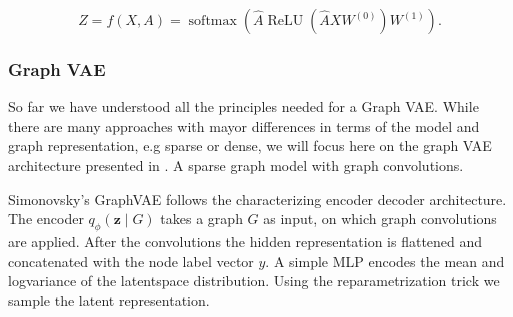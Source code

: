 \begin{equation}
    Z=f(X, A)=\operatorname{softmax}\left(\hat{A} \operatorname{ReLU}\left(\hat{A} X W^{(0)}\right) W^{(1)}\right).
\end{equation}




\subsubsection{Graph VAE}
\label{ssec:GVAE}

So far we have understood all the principles needed for a Graph VAE. While there are many approaches with mayor differences in terms of the model and graph representation, e.g sparse or dense, we will focus here on the graph VAE architecture presented in \cite{simonovsky_graphvae_2018}. A sparse graph model with graph convolutions.


Simonovsky's GraphVAE follows the characterizing encoder decoder architecture.
The encoder $q_{\phi}(\mathbf{z} \mid {G})$ takes a graph ${G}$ as input, on which graph convolutions are applied. After the convolutions the hidden representation is flattened and concatenated with the node label vector $y$. A simple MLP encodes the mean and logvariance of the latentspace distribution. Using the reparametrization trick we sample the latent representation.

